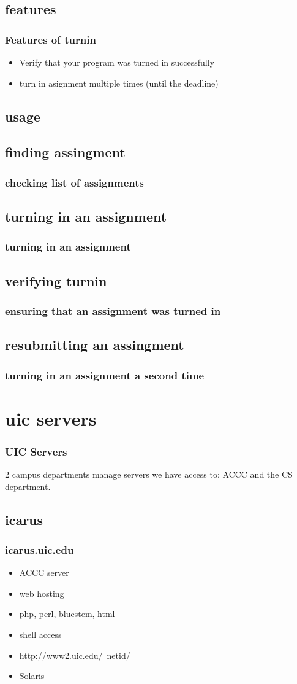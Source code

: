 \documentclass[hyperref={pdfpagelabels=false}]{beamer}
\begin{document}
\subsection{features}
\frame
{
    \frametitle{Features of turnin}
    \begin{itemize}
    \item{Verify that your program was turned in successfully}
    \item{turn in asignment multiple times (until the deadline)}
    \end{itemize}
}
\subsection{usage}
\subsection{finding assingment}
\frame
{
    \frametitle{checking list of assignments}
}
\subsection{turning in an assignment}
\frame
{
    \frametitle{turning in an assignment}
}
\subsection{verifying turnin}
\frame
{
    \frametitle{ensuring that an assignment was turned in}
}
\subsection{resubmitting an assingment}
\frame
{
    \frametitle{turning in an assignment a second time}
}
\section{uic servers}
\frame
{
    \frametitle{UIC Servers}
    2 campus departments manage servers we have access to: ACCC and the CS department.
}
\subsection{icarus}
\frame
{
    \frametitle{icarus.uic.edu}
    \begin{itemize}
    \item{ACCC server}
    \item{web hosting}
    \item{php, perl, bluestem, html}
    \item{shell access}
    \item{http://www2.uic.edu/~netid/}
    \item{Solaris}
    \end{itemize}
}
\end{document}
